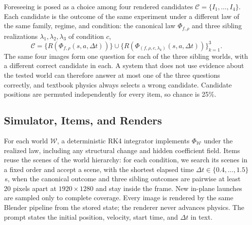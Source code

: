 
Foreseeing is posed as a choice among four rendered candidates $\mathcal{C}=\{I_1,\dots,I_4\}$.
Each candidate is the outcome of the same experiment under a different law of the same family,
regime, and condition: the canonical law $\Phi_{f,\rho}$ and three sibling realizations
$\lambda_1,\lambda_2,\lambda_3$ of condition $c$,
\begin{equation}
  \mathcal{C}=\{R(\Phi_{f,\rho}(s,a,\Delta t))\}\cup\{R(\Phi_{(f,\rho,c,\lambda_k)}(s,a,\Delta t))\}_{k=1}^{3}.
  \label{eq:law-contrastive}
\end{equation}
The same four images form one question for each of the three sibling worlds, with a different
correct candidate in each. A system that does not use evidence about the tested world can therefore
answer at most one of the three questions correctly, and textbook physics always selects a wrong
candidate. Candidate positions are permuted independently for every item, so chance is 25\%.

\subsection{Simulator, Items, and Renders}
For each world $\mathcal{W}$, a deterministic RK4 integrator implements $\Phi_{\mathcal{W}}$ under the
realized law, including any structural change and hidden coefficient field. Items reuse the scenes of
the world hierarchy: for each condition, we search its scenes in a fixed order and accept a scene,
with the shortest elapsed time $\Delta t\in\{0.4,\dots,1.5\}$\,s, when the canonical outcome and three
sibling outcomes are pairwise at least 20 pixels apart at $1920\times1280$ and stay inside the frame.
New in-plane launches are sampled only to complete coverage. Every image is rendered by the same
Blender pipeline from the stored state; the renderer never advances physics. The prompt states the
initial position, velocity, start time, and $\Delta t$ in text.

